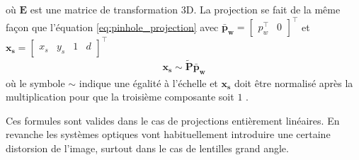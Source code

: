 où $\boldsymbol{E}$ est une matrice de transformation 3D. La projection se fait de la même façon que l'équation \ref{eq:pinhole_projection} avec $\boldsymbol{\bar{p}_w} = \begin{bmatrix}p_w^\top & 0 \end{bmatrix}^\top$ et $\boldsymbol{x_s} = \begin{bmatrix}x_s & y_s & 1 & d\end{bmatrix}^\top$
\begin{align}
  \boldsymbol{x_s} \sim \boldsymbol{\tilde{P}} \boldsymbol{\bar{p}_w}
\end{align}
où le symbole $\sim$ indique une égalité à l'échelle et $\boldsymbol{x_s}$ doit être normalisé après la multiplication pour que la troisième composante soit $1$ \citep{Szeliski2011}.

Ces formules sont valides dans le cas de projections entièrement linéaires. En revanche les systèmes optiques vont habituellement introduire une certaine distorsion de l'image, surtout dans le cas de lentilles grand angle.


